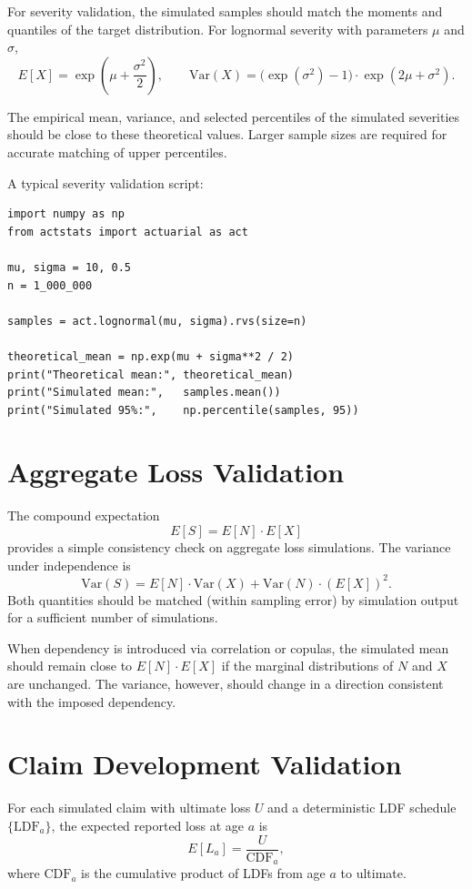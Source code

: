 For severity validation, the simulated samples should match the moments
and quantiles of the target distribution. For lognormal severity with
parameters $\mu$ and $\sigma$,
\[
    E[X] = \exp\!\left( \mu + \frac{\sigma^{2}}{2} \right),
    \qquad
    \mathrm{Var}(X) = \big( \exp(\sigma^{2}) - 1 \big) \cdot \exp(2\mu + \sigma^{2}).
\]

The empirical mean, variance, and selected percentiles of the simulated
severities should be close to these theoretical values. Larger sample
sizes are required for accurate matching of upper percentiles.

A typical severity validation script:

\begin{lstlisting}[style=pythonstyle]
import numpy as np
from actstats import actuarial as act

mu, sigma = 10, 0.5
n = 1_000_000

samples = act.lognormal(mu, sigma).rvs(size=n)

theoretical_mean = np.exp(mu + sigma**2 / 2)
print("Theoretical mean:", theoretical_mean)
print("Simulated mean:",   samples.mean())
print("Simulated 95%:",    np.percentile(samples, 95))
\end{lstlisting}

\section{Aggregate Loss Validation}

The compound expectation
\[
    E[S] = E[N] \cdot E[X]
\]
provides a simple consistency check on aggregate loss simulations. The
variance under independence is
\[
    \mathrm{Var}(S) = E[N] \cdot \mathrm{Var}(X)
                    + \mathrm{Var}(N) \cdot (E[X])^{2}.
\]
Both quantities should be matched (within sampling error) by simulation
output for a sufficient number of simulations.

When dependency is introduced via correlation or copulas, the simulated
mean should remain close to $E[N] \cdot E[X]$ if the marginal
distributions of $N$ and $X$ are unchanged. The variance, however,
should change in a direction consistent with the imposed dependency.

\section{Claim Development Validation}

For each simulated claim with ultimate loss $U$ and a deterministic
LDF schedule $\{\mathrm{LDF}_a\}$, the expected reported loss at age
$a$ is
\[
    E[L_a] = \frac{U}{\mathrm{CDF}_a},
\]
where $\mathrm{CDF}_a$ is the cumulative product of LDFs from age $a$
to ultimate.

